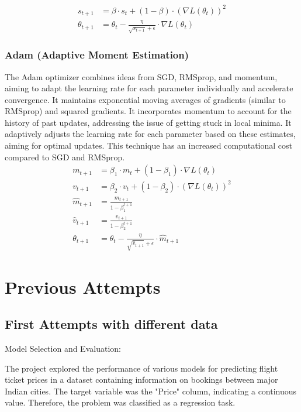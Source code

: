 \documentclass{article}
\begin{document}
\begin{align*}
    s_{t+1}      & = \beta \cdot s_t + (1 - \beta) \cdot (\nabla L(\theta_t))^2                 \\
    \theta_{t+1} & = \theta_t - \frac{\eta}{\sqrt{s_{t+1}} + \epsilon} \cdot \nabla L(\theta_t)
\end{align*}

\subsubsection{Adam (Adaptive Moment Estimation)}
The Adam optimizer combines ideas from SGD, RMSprop, and momentum, aiming to adapt the learning rate for each parameter individually and accelerate convergence.
It maintains exponential moving averages of gradients (similar to RMSprop) and squared gradients.
It incorporates momentum to account for the history of past updates, addressing the issue of getting stuck in local minima.
It adaptively adjusts the learning rate for each parameter based on these estimates, aiming for optimal updates. This technique has an increased computational cost compared to SGD and RMSprop.
\begin{align*}
    m_{t+1}       & = \beta_1 \cdot m_t + (1 - \beta_1) \cdot \nabla L(\theta_t)                  \\
    v_{t+1}       & = \beta_2 \cdot v_t + (1 - \beta_2) \cdot (\nabla L(\theta_t))^2              \\
    \hat{m}_{t+1} & = \frac{m_{t+1}}{1 - \beta_1^{t+1}}                                           \\
    \hat{v}_{t+1} & = \frac{v_{t+1}}{1 - \beta_2^{t+1}}                                           \\
    \theta_{t+1}  & = \theta_t - \frac{\eta}{\sqrt{\hat{v}_{t+1}} + \epsilon} \cdot \hat{m}_{t+1}
\end{align*}

\newpage
\section{Previous Attempts}
\subsection{First Attempts with different data}
Model Selection and Evaluation:

The project explored the performance of various models for predicting flight ticket prices in a dataset containing information on bookings between major Indian cities. The target variable was the "Price" column, indicating a continuous value. Therefore, the problem was classified as a regression task.
\end{document}
